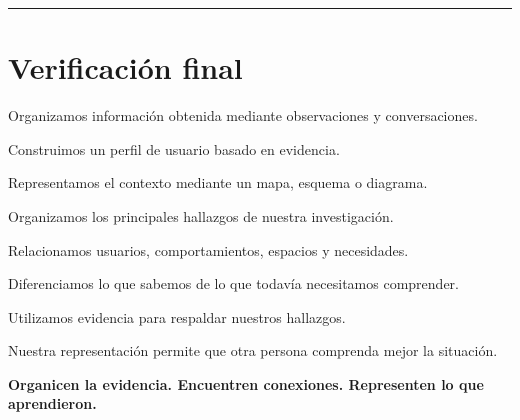 \documentclass[12pt,a4paper]{article}
\newcommand{\checkbox}{\fbox{\rule{0pt}{0.8ex}\rule{0.8ex}{0pt}}}
\begin{document}
	\rule{\linewidth}{0.4pt}
	
	\section*{Verificación final}
	
	\checkbox\quad Organizamos información obtenida mediante observaciones y conversaciones.
	
	\vspace{0.15cm}
	
	\checkbox\quad Construimos un perfil de usuario basado en evidencia.
	
	\vspace{0.15cm}
	
	\checkbox\quad Representamos el contexto mediante un mapa, esquema o diagrama.
	
	\vspace{0.15cm}
	
	\checkbox\quad Organizamos los principales hallazgos de nuestra investigación.
	
	\vspace{0.15cm}
	
	\checkbox\quad Relacionamos usuarios, comportamientos, espacios y necesidades.
	
	\vspace{0.15cm}
	
	\checkbox\quad Diferenciamos lo que sabemos de lo que todavía necesitamos comprender.
	
	\vspace{0.15cm}
	
	\checkbox\quad Utilizamos evidencia para respaldar nuestros hallazgos.
	
	\vspace{0.15cm}
	
	\checkbox\quad Nuestra representación permite que otra persona comprenda mejor la situación.
	
	\vspace{0.3cm}
	
	\begin{center}
		\textbf{Organicen la evidencia. Encuentren conexiones. Representen lo que aprendieron.}
	\end{center}
	
\end{document}
